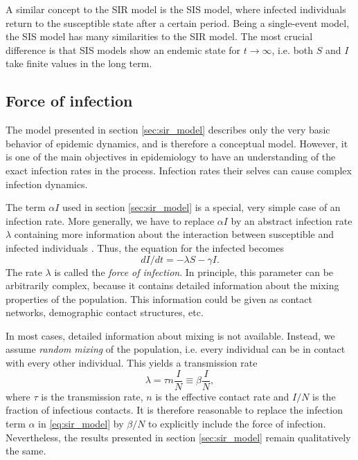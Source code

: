 A similar concept to the SIR model is the SIS model, where infected individuals return to the susceptible state after a certain period.
Being a single-event model, the SIS model has many similarities to the SIR model.
The most crucial difference is that SIS models show an endemic state for $t\rightarrow \infty $, i.e. both $S$ and $I$ take finite values in the long term.

\subsection{Force of infection}\label{sec:force_of_infection}
The model presented in section \ref{sec:sir_model} describes only the very basic behavior of epidemic dynamics, and is therefore a conceptual model.
However, it is one of the main objectives in epidemiology to have an understanding of the exact infection rates in the process.
Infection rates their selves can cause complex infection dynamics.

The term $\alpha I$ used in section \ref{sec:sir_model} is a special, very simple case of an infection rate.
More generally, we have to replace $\alpha I$ by an abstract infection rate $\lambda $ containing more information about the interaction between susceptible and infected individuals \citep{Keeling:2005}.
Thus, the equation for the infected becomes
\[
dI/dt = -\lambda S -\gamma I.
\]
The rate $\lambda $ is called the \emph{force of infection}.
In principle, this parameter can be arbitrarily complex, because it contains detailed information about the mixing properties of the population.
This information could be given as contact networks, demographic contact structures, etc.

In most cases, detailed information about mixing is not available.
Instead, we assume \emph{random mixing} of the population, i.e. every individual can be in contact with every other individual.
This yields a transmission rate \citep{Keeling:2005}
\begin{equation}\label{eq:force_of_infection}
\lambda = \tau n \frac{I}{N}\equiv \beta \frac{I}{N},
\end{equation}
where $\tau $ is the transmission rate, $n$ is the effective contact rate and $I/N$ is the fraction of infectious contacts.
It is therefore reasonable to replace the infection term $\alpha $ in \eqref{eq:sir_model} by $\beta /N$ to explicitly include the force of infection.
Nevertheless, the results presented in section \ref{sec:sir_model} remain qualitatively the same.

